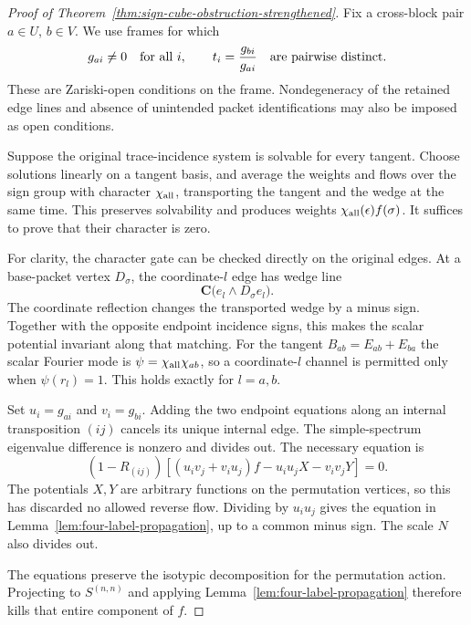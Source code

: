 \documentclass[11pt]{article}
\theoremstyle{definition}
\theoremstyle{remark}
\begin{document}
\begin{proof}[Proof of Theorem~\ref{thm:sign-cube-obstruction-strengthened}]
Fix a cross-block pair $a\in U$, $b\in V$.  We use frames for which
\begin{equation}\label{eq:four-label-frame-condition}
 g_{ai}\ne0\quad\hbox{for all }i,
 \qquad
 t_i=\frac{g_{bi}}{g_{ai}}\quad\hbox{are pairwise distinct}.
\end{equation}
These are Zariski-open conditions on the frame.  Nondegeneracy of the
retained edge lines and absence of unintended packet identifications may
also be imposed as open conditions.

Suppose the original trace-incidence system is solvable for every tangent.
Choose solutions linearly on a tangent basis, and average the weights and
flows over the sign group with character $\chi_{\rm all}$, transporting
the tangent and the wedge at the same time.  This preserves solvability
and produces weights $\chi_{\rm all}(\epsilon)f(\sigma)$.
It suffices to prove that their character is zero.

For clarity, the character gate can be checked directly on the original
edges.  At a base-packet vertex $D_\sigma$, the coordinate-$l$ edge has
wedge line
\[
 \mathbf C\bigl(e_l\wedge D_\sigma e_l\bigr).
\]
The coordinate reflection changes the transported wedge by a minus sign.
Together with the opposite endpoint incidence signs, this makes the
scalar potential invariant along that matching.  For the tangent
$B_{ab}=E_{ab}+E_{ba}$ the scalar Fourier mode is
$\psi=\chi_{\rm all}\chi_{ab}$, so a coordinate-$l$ channel is permitted
only when $\psi(r_l)=1$.  This holds exactly for $l=a,b$.

Set $u_i=g_{ai}$ and $v_i=g_{bi}$.  Adding the two endpoint equations
along an internal transposition $(ij)$ cancels its unique internal edge.
The simple-spectrum eigenvalue difference is nonzero and divides out.
The necessary equation is
\[
 (1-R_{(ij)})\left[
 (u_iv_j+v_iu_j)f-u_iu_jX-v_iv_jY\right]=0.
\]
The potentials $X,Y$ are arbitrary functions on the permutation vertices,
so this has discarded no allowed reverse flow.  Dividing by $u_iu_j$
gives the equation in Lemma~\ref{lem:four-label-propagation}, up to a
common minus sign.  The scale $N$ also divides out.

The equations preserve the isotypic decomposition for the permutation
action.  Projecting to $S^{(n,n)}$ and applying
Lemma~\ref{lem:four-label-propagation} therefore kills that entire
component of $f$.


\end{proof}
\end{document}
